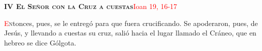 \noindent\textbf{\textsc{IV El Señor con la Cruz a cuestas}}\hfill\textcolor{red}{Ioan 19, 16-17}

\vspace{0.25em}

\lettrine[lines=2]{\textcolor{red}{E}}ntonces, pues, se le entregó para que fuera crucificando. Se apoderaron, pues, de Jesús, y llevando a cuestas su cruz, 
salió hacia el lugar llamado el Cráneo, que en hebreo se dice Gólgota.
